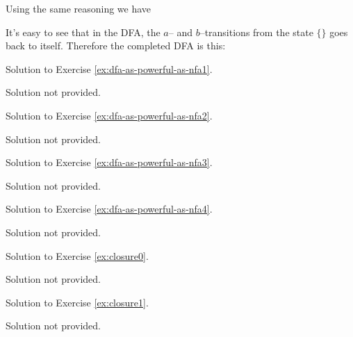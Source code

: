 

Using the same reasoning we have



It's easy to see that in the DFA, the $a$--
and $b$--transitions from the state $\{\}$ goes back to itself.
Therefore the completed DFA is this:




\newpage

Solution to Exercise \ref{ex:dfa-as-powerful-as-nfa1}.


    Solution not provided.
    

\newpage

Solution to Exercise \ref{ex:dfa-as-powerful-as-nfa2}.


    Solution not provided.
    

\newpage

Solution to Exercise \ref{ex:dfa-as-powerful-as-nfa3}.


    Solution not provided.
    

\newpage

Solution to Exercise \ref{ex:dfa-as-powerful-as-nfa4}.


    Solution not provided.
    

\newpage

Solution to Exercise \ref{ex:closure0}.


    Solution not provided.
    

\newpage

Solution to Exercise \ref{ex:closure1}.


    Solution not provided.
    

\newpage

